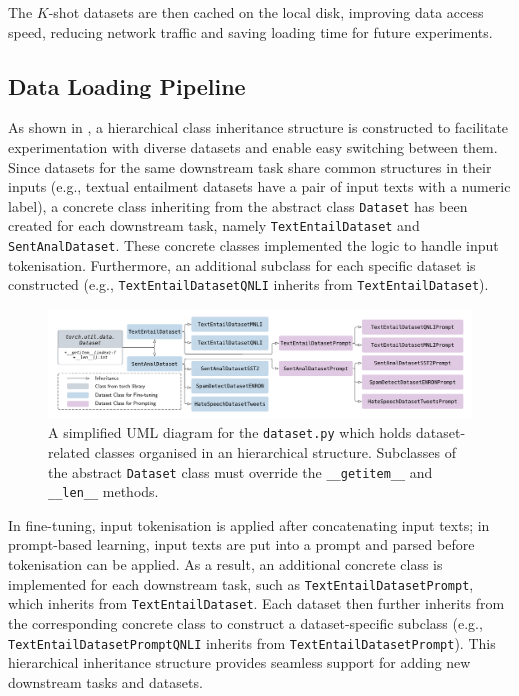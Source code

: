 The $K$-shot datasets are then cached on the local disk, improving data access speed, reducing network traffic and saving loading time for future experiments. 

\subsection{Data Loading Pipeline} \label{sec:dataset-2}
As shown in , a hierarchical class inheritance structure is constructed to facilitate experimentation with diverse datasets and enable easy switching between them. Since datasets for the same downstream task share common structures in their inputs (e.g., textual entailment datasets have a pair of input texts with a numeric label), a concrete class inheriting from the abstract class \texttt{Dataset} has been created for each downstream task, namely \texttt{TextEntailDataset} and \texttt{SentAnalDataset}. These concrete classes implemented the logic to handle input tokenisation. Furthermore, an additional subclass for each specific dataset is constructed (e.g., \texttt{TextEntailDatasetQNLI} inherits from \texttt{TextEntailDataset}).

\begin{figure}[!ht]
    \centering
    \includegraphics[width=\hsize]{figures/implementation_media/impl-datasets.pdf}
    \caption{A simplified UML diagram for the \texttt{dataset.py} which holds dataset-related classes organised in an hierarchical structure. Subclasses of the abstract \texttt{Dataset} class must override the \texttt{\_\_getitem\_\_} and \texttt{\_\_len\_\_} methods.}
    \label{fig:impl-datasets}
\end{figure}

In fine-tuning, input tokenisation is applied after concatenating input texts; in prompt-based learning, input texts are put into a prompt and parsed before tokenisation can be applied. As a result, an additional concrete class is implemented for each downstream task, such as \texttt{TextEntailDatasetPrompt}, which inherits from \texttt{TextEntailDataset}. Each dataset then further inherits from the corresponding concrete class to construct a dataset-specific subclass (e.g., \texttt{TextEntailDatasetPromptQNLI} inherits from \texttt{TextEntailDatasetPrompt}). This hierarchical inheritance structure provides seamless support for adding new downstream tasks and datasets.


